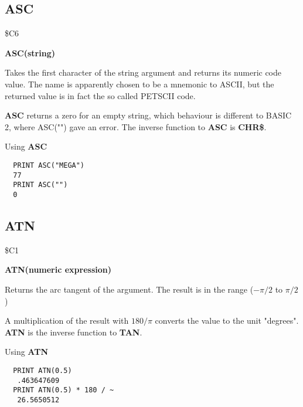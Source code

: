 \subsection{ASC}
\begin{description}[leftmargin=2cm,style=nextline]
\item [Token:] \$C6
\item [Format:] {\bf ASC(string)}
\item [Usage:] Takes the first character of
               the string argument and returns its numeric code value.
               The name is apparently chosen to be a mnemonic to ASCII,
               but the returned value is in fact the so called PETSCII code.
\item [Remarks:]
               {\bf ASC} returns a zero for an empty string, which behaviour
               is different to BASIC 2, where ASC("") gave an error.
               The inverse function to {\bf ASC} is {\bf CHR\$}.
\item [Example:] Using {\bf ASC}
\begin{tcolorbox}[colback=black,coltext=white]
\verbatimfont{\codefont}
\begin{verbatim}
  PRINT ASC("MEGA")
  77
  PRINT ASC("")
  0
\end{verbatim}
\end{tcolorbox}
\end{description}


\newpage
\subsection{ATN}
\begin{description}[leftmargin=2cm,style=nextline]
\item [Token:] \$C1
\item [Format:] {\bf ATN(numeric expression)}
\item [Usage:] Returns the arc tangent of the argument.
               The result is in the range ($-\pi/2$ to $\pi/2$)

\item [Remarks:]
               A multiplication of the result with $180/\pi$
               converts the value to the unit "degrees".
               {\bf ATN} is the inverse function to {\bf TAN}.
\item [Example:] Using {\bf ATN}
\begin{tcolorbox}[colback=black,coltext=white]
\verbatimfont{\codefont}
\begin{verbatim}
  PRINT ATN(0.5)
   .463647609
  PRINT ATN(0.5) * 180 / ~
   26.5650512
\end{verbatim}
\end{tcolorbox}
\end{description}

